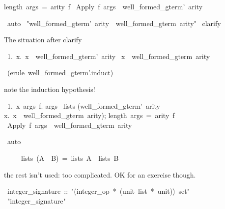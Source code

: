 \begin{isabelle}
\begin{isamarkuptxt}
\begin{isabelle}
length\ args\ =\ arity\ f\isasymrbrakk \isanewline
{}\isasymLongrightarrow \ Apply\ f\ args\ \isasymin \ well_formed_gterm'\ arity%
\end{isabelle}
\end{isamarkuptxt}
\ auto\isanewline
{}\isanewline
\isanewline
\isanewline
\isanewline
{}\ "well_formed_gterm'\ arity\ \isasymsubseteq \ well_formed_gterm\ arity"\isanewline
{}\ clarify%
\begin{isamarkuptxt}
The situation after clarify
\begin{isabelle}
\ 1.\ \isasymAnd x.\ x\ \isasymin \ well_formed_gterm'\ arity\ \isasymLongrightarrow \isanewline
{}x\ \isasymin \ well_formed_gterm\ arity%
\end{isabelle}
\end{isamarkuptxt}
\ (erule\ well_formed_gterm'.induct)
\begin{isamarkuptxt}
note the induction hypothesis!
\begin{isabelle}
\ 1.\ \isasymAnd x\ args\ f.\isanewline
{}\isasymlbrakk args\isanewline
{}\isasymin \ lists\isanewline
{}(well_formed_gterm'\ arity\ \isasyminter \isanewline
{}\isacharbraceleft x.\ x\ \isasymin \ well_formed_gterm\ arity\isacharbraceright );\isanewline
{}length\ args\ =\ arity\ f\isasymrbrakk \isanewline
{}\isasymLongrightarrow \ Apply\ f\ args\ \isasymin \ well_formed_gterm\ arity%
\end{isabelle}
\end{isamarkuptxt}
\ auto\isanewline
{}
\begin{isamarkuptext}
\begin{isabelle}
\ \ \ \ \ lists\ (A\ \isasyminter \ B)\ =\ lists\ A\ \isasyminter \ lists\ B%
\end{isabelle}
\end{isamarkuptext}
%
\begin{isamarkuptext}
the rest isn't used: too complicated.  OK for an exercise though.%
\end{isamarkuptext}
\ integer_signature\ ::\ "(integer_op\ *\ (unit\ list\ *\ unit))\ set"\isanewline
{}\ "integer_signature"\isanewline
{}\isanewline

\end{isabelle}
